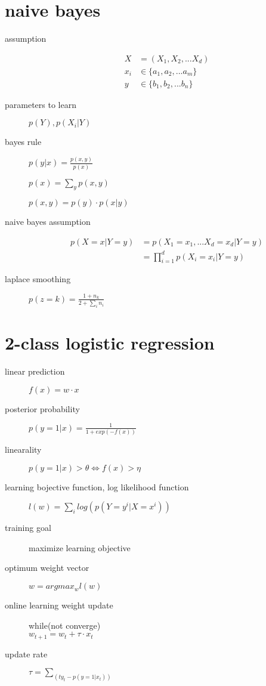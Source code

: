 \documentclass[12pt]{article}
\begin{document}
\begin{multicols}{2}
  \section{naive bayes}
  \begin{description}
  \item[assumption]
    \begin{align*}
      X &= (X_1, X_2, ... X_d) \\
      x_i &\in \{a_1, a_2, ... a_m\} \\
      y &\in \{b_1, b_2, ... b_n\}
    \end{align*}
  \item[parameters to learn] $p(Y), p(X_i|Y)$
  \item[bayes rule] $p(y|x) = \frac{p(x,y)}{p(x)}$
  \item[] $p(x) = \sum_y p(x,y)$
  \item[] $p(x,y) = p(y) \cdot p(x|y)$
  \item[naive bayes assumption]
    \begin{align*}
      p(X=x|Y=y)
      &= p(X_1=x_1, ... X_d=x_d|Y=y) \\
      &= \prod_{i=1}^d p(X_i=x_i|Y=y)
    \end{align*}
  \item[laplace smoothing] $p(z=k) = \frac{1+n_k}{2+\sum_i n_i}$
  \end{description}
  
  \section{2-class logistic regression}
  \begin{description}
  \item[linear prediction] $f(x) = w \cdot x$
  \item[posterior probability] $p(y=1|x)=\frac{1}{1+exp(-f(x))}$
  \item[linearality] $p(y=1|x) > \theta \iff f(x) > \eta$
  \item[learning bojective function, log likelihood function] $l(w) = \sum_i log (p(Y=y^i|X=x^i))$
  \item[training goal] maximize learning objective
  \item[optimum weight vector] $w = argmax_w l(w)$
  \item[online learning weight update] while(not converge)\\
    $w_{t+1} = w_t +  \tau \cdot x_t$
  \item[update rate] $\tau = \sum_(t y_t-p(y=1|x_t))$
  \end{description}


\end{multicols}
\end{document}
